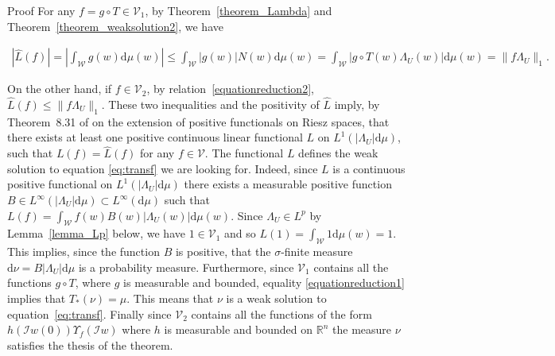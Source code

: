 \documentclass[a4paper,10pt]{article}
\newcommand{\asterisk}{\mathord{*}}
\newcommand{\mathd}{\mathrm{d}}
\newenvironment{proof*}[1]{\noindent\textbf{#1\ }}{\hspace*{\fill}$\Box$\medskip}
\begin{document}
\begin{proof*}{Proof}
  For any $f = g \circ T \in \mathcal{V}_1$, by Theorem~\ref{theorem_Lambda}
  and Theorem~\ref{theorem_weaksolution2}, we have
  
  \begin{multline*}
    | \hat{L} (f) | = \left| \int_{\mathcal{W}} g (w) \mathd \mu (w) \right|
    \leqslant \int_{\mathcal{W}} | g (w) | N (w) \mathd \mu (w) =
    \int_{\mathcal{W}} | g \circ T (w) \Lambda_U (w) | \mathd \mu (w) = \| f
    \Lambda_U \|_1 .
  \end{multline*}
  
  On the other hand, if $f \in \mathcal{V}_2$, by
  relation~{\eqref{equationreduction2}}, $\hat{L} (f) \leqslant \| f \Lambda_U
  \|_1$. These two inequalities and the positivity of $\hat{L}$ imply, by
  Theorem~8.31 of {\cite{Aliprantis2006}} on the extension of positive
  functionals on Riesz spaces, that there exists at least one positive
  continuous linear functional $L$ on $L^1 (| \Lambda_U | \mathd \mu)$, such
  that $L (f) = \hat{L} (f)$ for any $f \in \mathcal{V}$. The functional $L$
  defines the weak solution to equation {\eqref{eq:transf}} we are looking
  for. Indeed, since $L$ is a continuous positive functional on $L^1 (|
  \Lambda_U | \mathd \mu)$ there exists a measurable positive function $B \in
  L^{\infty} (| \Lambda_U | \mathd \mu) \subset L^{\infty} (\mathd \mu)$ such
  that $L (f) = \int_{\mathcal{W}} f (w) B (w) | \Lambda_U (w) | \mathd \mu
  (w)$. Since $\Lambda_U \in L^p$ by Lemma~\ref{lemma_Lp} below, we have $1
  \in \mathcal{V}_1$ and so $L (1) = \int_{\mathcal{W}} 1 \mathd \mu (w) = 1$.
  This implies, since the function $B$ is positive, that the $\sigma$-finite
  measure $\mathd \nu = B | \Lambda_U | \mathd \mu$ is a probability measure.
  Furthermore, since $\mathcal{V}_1$ contains all the functions $g \circ T$,
  where $g$ is measurable and bounded, equality {\eqref{equationreduction1}}
  implies that $T_{\asterisk} (\nu) = \mu$. This means that $\nu$ is a weak
  solution to equation~{\eqref{eq:transf}}. Finally since $\mathcal{V}_2$
  contains all the functions of the form $h (\mathcal{I}w (0)) \Upsilon_f
  (\mathcal{I}w)$ where $h$ is measurable and bounded on $\mathbb{R}^n$ the
  measure $\nu$ satisfies the thesis of the theorem.
\end{proof*}
\end{document}
